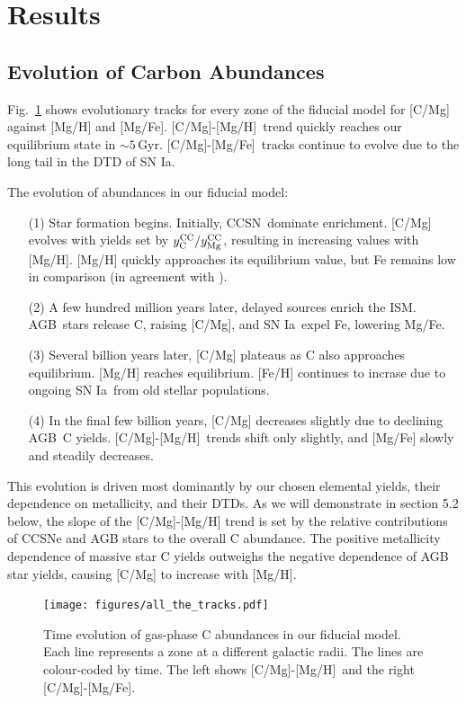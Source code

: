 \documentclass[fleqn,
usenatbib]{mnras}
\newcommand{\agb}{AGB}
\newcommand{\cc}{CCSN}
\newcommand{\ia}{SN Ia}
\newcommand{\caah}{[C/Mg]-[Mg/H]}
\newcommand{\caafe}{[C/Mg]-[Mg/Fe]}
\newcommand{\Ycc}{\ensuremath{y_{\rm C}^{\rm CC}}}
\newcommand{\Yoc}{\ensuremath{y_{\rm Mg}^{\rm CC}}}
\newcommand{\about}[1]{${\sim} #1$}
\begin{document}
\section{Results}\label{sec:results}

\subsection{Evolution of Carbon Abundances}

Fig.~\ref{fig:c_evo} shows evolutionary tracks for every zone of the fiducial model for [C/Mg] against [Mg/H] and [Mg/Fe].
\caah\ trend quickly reaches our equilibrium state in \about{5}\,Gyr. \caafe\ tracks continue to evolve due to the long tail in the DTD of \ia. 


The evolution of abundances in our fiducial model:
\begin{enumerate}
    \item[(1)] Star formation begins. Initially, \cc\ dominate enrichment. [C/Mg] evolves with yields set by $\Ycc/\Yoc$, resulting in increasing values with [Mg/H].  [Mg/H] quickly approaches its equilibrium value, but Fe remains low in comparison (in agreement with \citealt{WAF17}).
    \item[(2)]  A few hundred million years later,  delayed sources  enrich the ISM. \agb\ stars release C, raising [C/Mg], and \ia\ expel Fe, lowering Mg/Fe. 
    \item[(3)] Several billion years later, [C/Mg] plateaus as C also approaches equilibrium. [Mg/H] reaches equilibrium. [Fe/H] continues to incrase due to ongoing \ia\ from old stellar populations.
    \item[(4)] In the final few billion years, [C/Mg] decreases slightly due to declining \agb\ C yields. \caah\ trends shift only slightly, and [Mg/Fe] slowly and steadily decreases.

\end{enumerate}


This evolution is driven most dominantly by our chosen elemental yields, their
dependence on metallicity, and their DTDs.
As we will demonstrate in section 5.2 below, the slope of the [C/Mg]-[Mg/H] trend is
set by the relative contributions of CCSNe and AGB stars to the overall C abundance.
The positive metallicity dependence of massive star C yields outweighs the negative
dependence of AGB star yields, causing [C/Mg] to increase with [Mg/H].


\begin{figure}
\centering
\texttt{[image: figures/all\_the\_tracks.pdf]}
\caption[]{
    Time evolution of gas-phase C abundances in our fiducial model.
    Each line represents a zone at a different galactic radii. The lines are colour-coded by time. The left shows \caah\ and the right \caafe. 
}
\label{fig:c_evo}
\end{figure}
\end{document}
